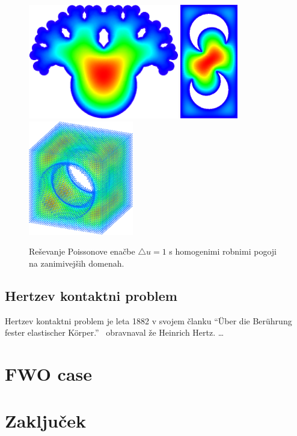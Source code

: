\documentclass[12pt,a4paper,twoside]{article}
\theoremstyle{definition} %
\theoremstyle{plain} %
\numberwithin{equation}{section}
\newcommand{\lap}{\triangle}
\begin{document}
\begin{figure}[h]
  \centering
  \includegraphics[height=5cm]{images/poisson_weird1.png}
  \hspace{10pt}
  \includegraphics[height=5cm]{images/poisson_weird2.png}
  \hspace{10pt}
  \includegraphics[height=5cm]{images/poisson_weird3.png}
  \caption{Reševanje Poissonove enačbe $\lap u = 1$ s homogenimi robnimi pogoji na
  zanimivejših domenah.}
  \label{fig:poisson-square-weird}
\end{figure}

\subsection{Hertzev kontaktni problem}
Hertzev kontaktni problem je leta 1882 v svojem članku ``{\"U}ber die Ber{\"u}hrung fester
elastischer K{\"o}rper.''~\cite{hertz1882beruhrung} obravnaval že Heinrich Hertz.
 \dots

\section{FWO case}

\section{Zaključek}

\cleardoublepage
{}


\end{document}
